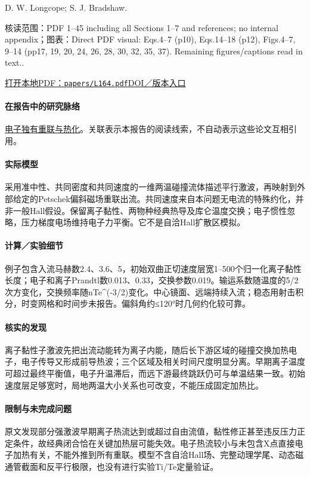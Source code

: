 \documentclass[UTF8,a4paper,11pt,openany,fontset=fandol]{ctexbook}
\begin{document}
D. W. Longcope;  S. J. Bradshaw.

\textsf{核读范围：}PDF 1–45 including all Sections 1–7 and references;  no internal appendix；\textsf{图表：}Direct PDF visual: Eqs.4–7 (p10),  Eqs.14–18 (p12),  Figs.4–7, 9–14 (pp17, 19, 20, 24, 26, 28, 30, 32, 35, 37). Remaining figures/captions read in text..

\href{run:../papers/L164.pdf}{打开本地PDF：\texttt{papers/L164.pdf}}\quad\href{https://doi.org/10.1088/0004-637X/718/2/1491}{DOI／版本入口}

\paragraph{在报告中的研究脉络}\hyperref[story:energy]{电子独有重联与热化}。关联表示本报告的阅读线索，不自动表示这些论文互相引用。

\paragraph{实际模型}采用准中性、共同密度和共同速度的一维两温碰撞流体描述平行激波，再映射到外部给定的Petschek偏斜磁场重联出流。共同速度来自本问题无电流的特殊约化，并非一般Hall假设。保留离子黏性、两物种经典热导及库仑温度交换；电子惯性忽略，压力梯度电场维持电子力平衡。它不是自洽Hall扩散区模拟。

\paragraph{计算／实验细节}例子包含入流马赫数2.4、3.6、5，初始双曲正切速度层宽1–500个归一化离子黏性长度；电子和离子Prandtl数0.013、0.33，交换参数0.019。输运系数随温度的5/2次方变化，交换频率随nTe\textasciicircum{}(-3/2)变化。中心镜面、远端持续入流；稳态用射击积分，时变网格和时间步未报告。偏斜角约≤120°时几何约化较可靠。

\paragraph{核实的发现}离子黏性子激波先把出流动能转为离子内能，随后长下游区域的碰撞交换加热电子，电子传导又形成前导热波；三个区域及相关时间尺度明显分离。早期离子温度可超过最终平衡值，电子升温滞后，而远下游最终跳跃仍可与单温结果一致。初始速度层足够宽时，局地两温大小关系也可改变，不能压成固定加热比。

\paragraph{限制与未完成问题}原文发现部分强激波早期离子热流达到或超过自由流值，黏性修正甚至违反压力正定条件，故经典闭合恰在关键加热层可能失效。电子热流较小与未包含X点直接电子加热有关，不能外推到所有重联。模型不含自洽Hall场、完整动理学尾、动态磁通管截面和反平行极限，也没有进行实验Ti/Te定量验证。
\end{document}
